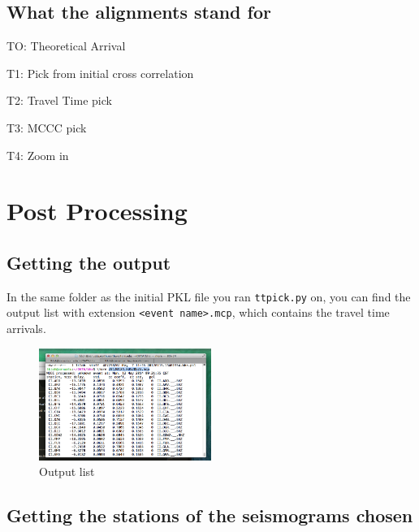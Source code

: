 \documentclass[letterpaper,10pt]{article}
\begin{document}
\subsection{What the alignments stand for}

TO: Theoretical Arrival

T1: Pick from initial cross correlation

T2: Travel Time pick

T3: MCCC pick

T4: Zoom in


\section{Post Processing}

\subsection{Getting the output}

In the same folder as the initial PKL file you ran \texttt{ttpick.py} on, you can find the output list with extension \texttt{<event name>.mcp}, which contains the travel time arrivals. 

\begin{figure}[h!]
  \centering
  \includegraphics[width=0.5\textwidth]{images/output_list}
  \caption{Output list}
  \label{fig:output_list}
\end{figure}

\subsection{Getting the stations of the seismograms chosen}
\end{document}
